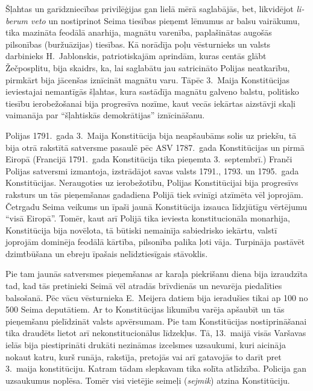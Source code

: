 \documentclass[twoside,a5paper,12pt,fleqn,openany]{extbook}
\newcommand{\pltxti}[1]{\textit{\textpolish{#1}}}
\newcommand{\latxti}[1]{\textit{\textlatin{#1}}}
\begin{document}
Šļahtas un garīdzniecības privilēģijas gan lielā mērā saglabājās, bet, likvidējot \latxti{liberum veto} un nostiprinot Seima tiesības pieņemt lēmumus ar balsu vairākumu, tika mazināta feodālā anarhija, magnātu varenība, paplašinātas augošās pilsonības (buržuāzijas) tiesības. Kā norādīja poļu vēsturnieks un valsts darbinieks H.~Jablonskis, patriotiskajām aprindām, kuras centās glābt Žečposplitu, bija skaidrs, ka, lai saglabātu jau satricināto Polijas neatkarību, pirmkārt bija jācenšas iznīcināt magnātu varu. Tāpēc 3.~Maija Konstitūcijas ieviestajai nemantīgās šļahtas, kura sastādīja magnātu galveno balstu, politisko tiesību ierobežošanai bija progresīva nozīme, kaut vecās iekārtas aizstāvji skaļi vaimanāja par ``šļahtiskās demokrātijas'' iznīcināšanu.

Polijas 1791.~gada 3.~Maija Konstitūcija bija neapšaubāms solis uz priekšu, tā bija otrā rakstītā satversme pasaulē pēc ASV 1787.~gada Konstitūcijas un pirmā Eiropā (Francijā 1791.~gada Konstitūcija tika pieņemta 3.~septembrī.) Franči Polijas satversmi izmantoja, izstrādājot savas valsts 1791., 1793. un 1795.~gada Konstitūcijas. Neraugoties uz ierobežotību, Polijas Konstitūcijai bija progresīvs raksturs un tās pieņemšanas gadadiena Polijā tiek svinīgi atzīmēta vēl joprojām. Četrgadu Seima veikums un īpaši jaunā Konstitūcija izsauca līdzjūtīgu vērtējumu ``visā Eiropā''. Tomēr, kaut arī Polijā tika ieviesta konstitucionāla monarhija, Konstitūcija bija novēlota, tā būtiski nemainīja sabiedrisko iekārtu, valstī joprojām dominēja feodālā kārtība, pilsonība palika ļoti vāja. Turpināja pastāvēt dzimtbūšana un ebreju īpašais nelīdztiesīgais stāvoklis.

Pie tam jaunās satversmes pieņemšanas ar karaļa piekrišanu diena bija izraudzīta tad, kad tās pretinieki Seimā vēl atradās brīvdienās un nevarēja piedalīties balsošanā. Pēc vācu vēsturnieka E.~Meijera datiem bija ieradušies tikai ap 100 no 500 Seima deputātiem. Ar to Konstitūcijas likumību varēja apšaubīt un tās pieņemšanu pielīdzināt valsts apvērsumam. Pie tam Konstitūcijas nostiprināšanai tika draudēts lietot arī nekonstitucionālus līdzekļus. Tā, 13.~maijā visās Varšavas ielās bija piestiprināti drukāti nezināmas izcelsmes uzsaukumi, kuri aicināja nokaut katru, kurš runāja, rakstīja, pretojās vai arī gatavojās to darīt pret 3.~maija konstitūciju. Katram tādam slepkavam tika solīta atlīdzība. Policija gan uzsaukumus noplēsa. Tomēr visi vietējie seimeļi (\pltxti{sejmik}) atzina Konstitūciju.
\end{document}
